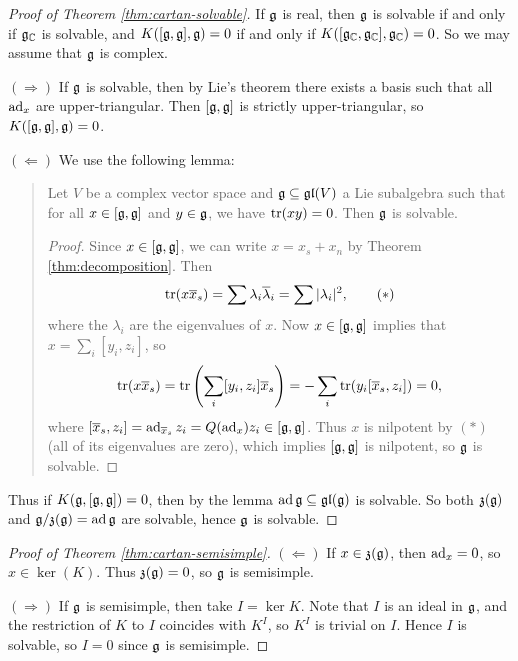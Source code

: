 \begin{proof}[Proof of Theorem \ref{thm:cartan-solvable}]
  If $\mathfrak{g}$ is real, then $\mathfrak{g}$ is solvable
  if and only if $\mathfrak{g}_{\mathbb{C}}$ is solvable,
  and $K([\mathfrak{g}, \mathfrak{g}], \mathfrak{g}) = 0$
  if and only if $K([\mathfrak{g}_{\mathbb{C}}, \mathfrak{g}_{\mathbb{C}}], \mathfrak{g}_{\mathbb{C}}) = 0$.
  So we may assume that $\mathfrak{g}$ is complex.

  $(\Rightarrow)$ If $\mathfrak{g}$ is
  solvable, then by Lie's theorem
  there exists a basis such that all
  $\operatorname{ad}_x$ are upper-triangular. Then
  $[\mathfrak{g}, \mathfrak{g}]$ is strictly upper-triangular,
  so $K([\mathfrak{g}, \mathfrak{g}], \mathfrak{g}) = 0$.

  $(\Leftarrow)$ We use the following
  lemma:
  \begin{quote}
    \vspace{-2em}
    \begin{lemma}
      Let $V$ be a complex vector space
      and $\mathfrak{g} \subseteq \mathfrak{gl}(V)$ a Lie
      subalgebra such that for all
      $x \in [\mathfrak{g}, \mathfrak{g}]$ and
      $y \in \mathfrak{g}$, we have
      $\operatorname{tr}(xy) = 0$. Then
      $\mathfrak{g}$ is solvable.
    \end{lemma}

    \begin{proof}
      Since $x \in [\mathfrak{g}, \mathfrak{g}]$, we can
      write $x = x_s + x_n$ by
      Theorem \ref{thm:decomposition}.
      Then
      \[
        \operatorname{tr}(x \overline{x}_s)
        = \sum \lambda_i \overline{\lambda}_i
        = \sum |\lambda_i|^2,
        \tag{$*$}
      \]
      where the $\lambda_i$ are the
      eigenvalues of $x$. Now
      $x \in [\mathfrak{g}, \mathfrak{g}]$ implies
      that $x = \sum_i [y_i, z_i]$, so
      \[
        \operatorname{tr}(x \overline{x}_s)
        = \operatorname{tr}\left(\sum_i [y_i, z_i] \overline{x}_s\right)
        = - \sum_i \operatorname{tr}(y_i [\overline{x}_s, z_i])
        = 0,
      \]
      where $[\overline{x}_s, z_i] = \operatorname{ad}_{\overline{x}_s} z_i = Q(\operatorname{ad}_{x}) z_i \in [\mathfrak{g}, \mathfrak{g}]$.
      Thus $x$ is nilpotent by $(*)$
      (all of its eigenvalues are zero), which
      implies $[\mathfrak{g}, \mathfrak{g}]$ is nilpotent,
      so $\mathfrak{g}$ is solvable.
    \end{proof}
  \end{quote}
  Thus if $K(\mathfrak{g}, [\mathfrak{g}, \mathfrak{g}]) = 0$,
  then by the lemma $\operatorname{ad} \mathfrak{g} \subseteq \mathfrak{gl}(\mathfrak{g})$
  is solvable. So both $\mathfrak{z}(\mathfrak{g})$
  and $\mathfrak{g} / \mathfrak{z}(\mathfrak{g}) = \operatorname{ad} \mathfrak{g}$
  are solvable, hence $\mathfrak{g}$ is solvable.
\end{proof}

\begin{proof}[Proof of Theorem \ref{thm:cartan-semisimple}]
  $(\Leftarrow)$ If
  $x \in \mathfrak{z}(\mathfrak{g})$, then
  $\operatorname{ad}_x = 0$, so
  $x \in \ker(K)$. Thus
  $\mathfrak{z}(\mathfrak{g}) = 0$, so
  $\mathfrak{g}$ is semisimple.

  $(\Rightarrow)$ If
  $\mathfrak{g}$ is semisimple, then
  take $I = \ker K$. Note that
  $I$ is an ideal in $\mathfrak{g}$, and
  the restriction of $K$ to $I$ coincides
  with $K^I$, so $K^I$ is trivial
  on $I$. Hence $I$ is solvable, so
  $I = 0$ since $\mathfrak{g}$ is semisimple.
\end{proof}

